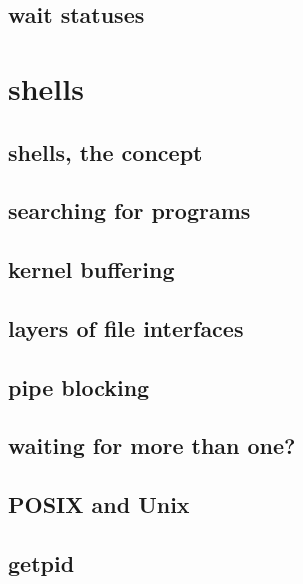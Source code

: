 \subsection{wait statuses}


\section{shells}

\subsection{shells, the concept}



\subsection{searching for programs}


\subsection{kernel buffering}



\subsection{layers of file interfaces}




\subsection{pipe blocking}

\subsection{waiting for more than one?}




\subsection{POSIX and Unix}



\subsection{getpid}

